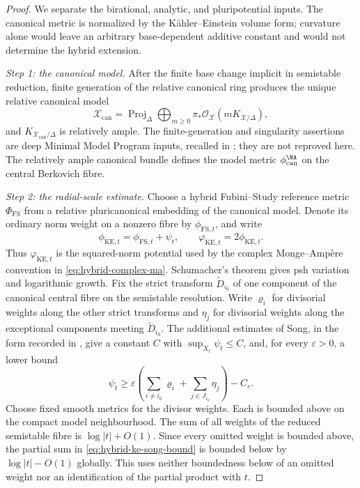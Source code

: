 \begin{proof}
We separate the birational, analytic, and pluripotential inputs. The
canonical metric is normalized by the K\"ahler--Einstein volume form;
curvature alone would leave an arbitrary base-dependent additive constant
and would not determine the hybrid extension.

\smallskip
\noindent\emph{Step 1: the canonical model.}
After the finite base change implicit in semistable reduction, finite
generation of the relative canonical ring produces the unique relative
canonical model
\[
 \mathscr X_{\mathrm{can}}
   =\operatorname{Proj}_{\Delta}
       \bigoplus_{m\geq0}
       \pi_*\mathcal O_{\mathscr X}
                    (mK_{\mathscr X/\Delta}),
\tag{66.35a}\label{eq:hybrid-relative-canonical-model}
\]
and $K_{\mathscr X_{\mathrm{can}}/\Delta}$ is relatively ample.  The
finite-generation and singularity assertions are deep Minimal Model
Program inputs, recalled in \cite[Theorem~5.3]{PS23Hybrid}; they are not
reproved here.  The relatively ample canonical bundle defines the model
metric $\phi_{\mathrm{can}}^{\NA}$ on the central Berkovich fibre.

\smallskip
\noindent\emph{Step 2: the radial-scale estimate.}
Choose a hybrid Fubini--Study reference metric $\Phi_{\mathrm{FS}}$ from
a relative pluricanonical embedding of the canonical model.  Denote its
ordinary norm weight on a nonzero fibre by $\phi_{\mathrm{FS},t}$, and
write
\[
             \phi_{\mathrm{KE},t}
             =\phi_{\mathrm{FS},t}+\psi_t,
 \qquad
             \varphi_{\mathrm{KE},t}=2\phi_{\mathrm{KE},t}.
\tag{66.35b}\label{eq:hybrid-ke-reference-potential}
\]
Thus $\varphi_{\mathrm{KE},t}$ is the squared-norm potential used by the
complex Monge--Amp\`ere convention in \eqref{eq:hybrid-complex-ma}.
Schumacher's theorem gives psh variation and logarithmic growth.  Fix the strict transform $\widetilde D_{i_0}$ of one component of the
canonical central fibre on the semistable resolution.  Write $\varrho_i$ for
divisorial weights along the other strict transforms and $\eta_j$ for
divisorial weights along the exceptional components meeting
$\widetilde D_{i_0}$.  The additional estimates of Song, in the form
recorded in \cite[Proposition~5.7]{PS23Hybrid}, give a constant $C$ with
$\sup_{X_t}\psi_t\leq C$, and, for every $\varepsilon>0$, a lower
bound
\[
 \psi_t\geq
 \varepsilon\!\left(
    \sum_{i\neq i_0}\varrho_i+
    \sum_{j\in J_{i_0}}\eta_j
 \right)-C_\varepsilon.
\tag{66.35c}\label{eq:hybrid-ke-song-bound}
\]
Choose fixed smooth metrics for the divisor weights. Each is bounded
above on the compact model neighbourhood. The sum of all weights of the
reduced semistable fibre is $\log|t|+O(1)$. Since every omitted weight is
bounded above, the partial sum in \eqref{eq:hybrid-ke-song-bound} is
bounded below by $\log|t|-O(1)$ globally. This uses neither boundedness
below of an omitted weight nor an identification of the partial product
with $t$.


\end{proof}
